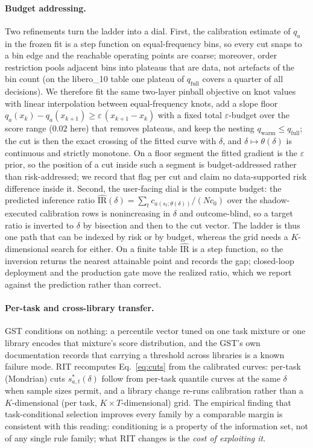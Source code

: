 \documentclass{article}
\begin{document}
\paragraph{Budget addressing.}
Two refinements turn the ladder into a dial. First, the calibration estimate
of $q_a$ in the frozen fit is a step function on equal-frequency bins, so
every cut snaps to a bin edge and the reachable operating points are coarse;
moreover, order restriction pools adjacent bins into plateaus that are data,
not artefacts of the bin count (on the libero\_10 table one plateau of
$q_{\mathrm{full}}$ covers a quarter of all decisions). We therefore fit the
same two-layer pinball objective on knot values with linear interpolation
between equal-frequency knots, add a slope floor
$q_a(x_k) - q_a(x_{k+1}) \ge \varepsilon\,(x_{k+1}-x_k)$ with a fixed total
$\varepsilon$-budget over the score range ($0.02$ here) that removes
plateaus, and keep the nesting $q_{\mathrm{warm}} \le q_{\mathrm{full}}$; the
cut is then the exact crossing of the fitted curve with $\delta$, and
$\delta \mapsto \theta(\delta)$ is continuous and strictly monotone. On a
floor segment the fitted gradient is the $\varepsilon$ prior, so the position
of a cut inside such a segment is budget-addressed rather than
risk-addressed; we record that flag per cut and claim no data-supported risk
difference inside it. Second, the user-facing dial is the compute budget:
the predicted inference ratio
$\widehat{\mathrm{IR}}(\delta) = \sum_t c_{a(s_t;\theta(\delta))} / (N c_0)$
over the shadow-executed calibration rows is nonincreasing in $\delta$ and
outcome-blind, so a target ratio is inverted to $\delta$ by bisection and
then to the cut vector. The ladder is thus one path that can be indexed by
risk or by budget, whereas the grid needs a $K$-dimensional search for
either. On a finite table $\widehat{\mathrm{IR}}$ is a step function, so the
inversion returns the nearest attainable point and records the gap;
closed-loop deployment and the production gate move the realized ratio,
which we report against the prediction rather than correct.

\paragraph{Per-task and cross-library transfer.}
GST conditions on nothing: a percentile vector tuned on one task
mixture or one library encodes that mixture's score distribution, and the
GST's own documentation records that carrying a threshold across
libraries is a known failure mode. RIT recomputes
Eq.~\ref{eq:cuts} from the calibrated curves: per-task (Mondrian) cuts
$s^{*}_{a,t}(\delta)$ follow from per-task quantile curves at the same
$\delta$ when sample sizes permit, and a library change re-runs calibration
rather than a $K$-dimensional (per task, $K \times T$-dimensional) grid.
The empirical finding that task-conditional selection improves every family
by a comparable margin is consistent with this reading: conditioning is a
property of the information set, not of any single rule family; what RIT
changes is the \emph{cost of exploiting it}.
\end{document}
